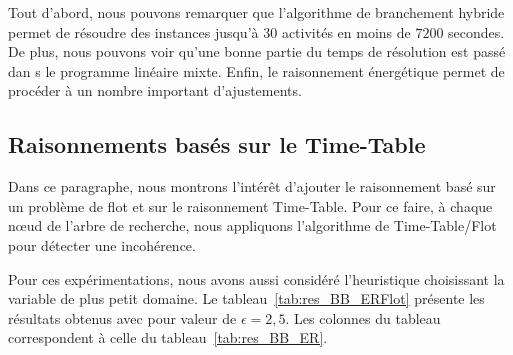 Tout d'abord, nous pouvons remarquer que l'algorithme de branchement
hybride permet de résoudre des instances jusqu'à $30$ activités en
moins de $7200$ secondes. De plus, nous pouvons voir qu'une bonne
partie du temps de résolution est passé dan s le programme linéaire
mixte. Enfin, le raisonnement énergétique permet de procéder à un
nombre important d'ajustements. 

\subsection{Raisonnements basés sur le Time-Table}
\label{sec:expe_TT}

Dans ce paragraphe, nous montrons l'intérêt d'ajouter le
raisonnement basé sur un problème de flot et sur le raisonnement
Time-Table. Pour ce faire, à chaque n\oe ud de l'arbre de recherche,
nous appliquons l'algorithme de Time-Table/Flot pour détecter une
incohérence. 

Pour ces expérimentations, nous avons aussi considéré l'heuristique
choisissant la variable de plus petit domaine. Le
tableau~\ref{tab:res_BB_ERFlot} présente les résultats obtenus avec
pour valeur de $\epsilon=2,5$. Les colonnes du tableau correspondent
à celle du tableau~\ref{tab:res_BB_ER}.

